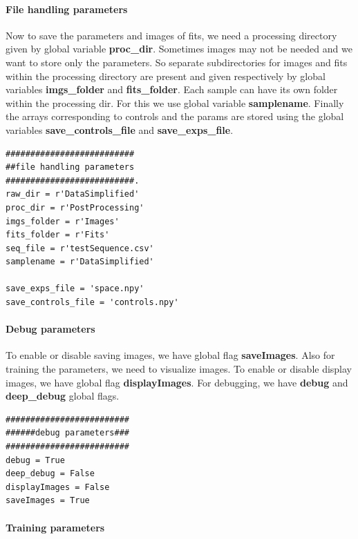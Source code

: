 \documentclass[12pt, twoside, a4paper]{article}
\begin{document}
\paragraph{File handling parameters}
Now to save the parameters and images of fits, we need a processing directory given by global variable \textbf{proc\_dir}. Sometimes images may not be needed and we want to store only the parameters. So separate subdirectories for images and fits within the processing directory are present and given respectively by global variables \textbf{imgs\_folder} and \textbf{fits\_folder}. Each sample can have its own folder within the processing dir. For this we use global variable \textbf{samplename}. Finally the arrays corresponding to controls and the params are stored using the global variables \textbf{save\_controls\_file} and \textbf{save\_exps\_file}.
%
\begin{verbatim}
##########################
##file handling parameters
##########################.
raw_dir = r'DataSimplified'
proc_dir = r'PostProcessing'
imgs_folder = r'Images'
fits_folder = r'Fits'
seq_file = r'testSequence.csv'
samplename = r'DataSimplified'

save_exps_file = 'space.npy'
save_controls_file = 'controls.npy'
\end{verbatim}

\paragraph{Debug parameters}
To enable or disable saving images, we have global flag \textbf{saveImages}. Also for training the parameters, we need to visualize images. To enable or disable display images, we have global flag \textbf{displayImages}. For debugging, we have \textbf{debug} and \textbf{deep\_debug} global flags.
%
\begin{verbatim}
#########################
######debug parameters###
#########################
debug = True
deep_debug = False
displayImages = False
saveImages = True
\end{verbatim}
%
\paragraph{Training parameters}
\end{document}
